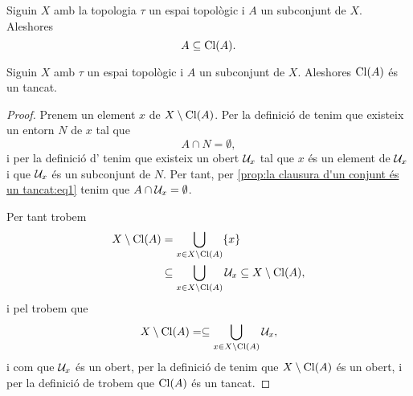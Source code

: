 \documentclass[../../Main.tex]{subfiles}
\begin{document}
	\begin{observation}
		\label{obs:la clausura d'un conjunt conté el conjunt}
		Siguin \(X\) amb la topologia \(\tau\) un espai topològic i \(A\) un subconjunt de \(X\). Aleshores
		\[
		    A\subseteq\operatorname{Cl}(A).
		\]
	\end{observation}
	\begin{proposition}
		\label{prop:la clausura d'un conjunt és un tancat}
		Siguin \(X\) amb \(\tau\) un espai topològic i \(A\) un subconjunt de \(X\). Aleshores \(\operatorname{Cl}(A)\) és un tancat.
		\begin{proof}
			 Prenem un element \(x\) de \(X\setminus\operatorname{Cl}(A)\). Per la definició de  tenim que existeix un entorn \(N\) de \(x\) tal que
			 \begin{equation}
			 	\label{prop:la clausura d'un conjunt és un tancat:eq1}
				 A\cap N=\emptyset,
			 \end{equation}
			 i per la definició d' tenim que existeix un obert \(\mathcal{U}_{x}\) tal que \(x\) és un element de \(\mathcal{U}_{x}\) i que \(\mathcal{U}_{x}\) és un subconjunt de \(N\). Per tant, per \eqref{prop:la clausura d'un conjunt és un tancat:eq1} tenim que \(A\cap\mathcal{U}_{x}=\emptyset\).
			 
			 Per tant trobem
			 \begin{align*}
				 X\setminus\operatorname{Cl}(A)&=\bigcup_{x\in X\setminus\operatorname{Cl}(A)}\{x\} \\
				 &\subseteq\bigcup_{x\in X\setminus\operatorname{Cl}(A)}\mathcal{U}_{x}\subseteq X\setminus\operatorname{Cl}(A),
			 \end{align*}
			 i pel  trobem que
			 \[
			     X\setminus\operatorname{Cl}(A)=\subseteq\bigcup_{x\in X\setminus\operatorname{Cl}(A)}\mathcal{U}_{x},
			 \]
			 i com que \(\mathcal{U}_{x}\) és un obert, per la definició de  tenim que \(X\setminus\operatorname{Cl}(A)\) és un obert, i per la definició de  trobem que \(\operatorname{Cl}(A)\) és un tancat.
		\end{proof}
	\end{proposition}
\end{document}

